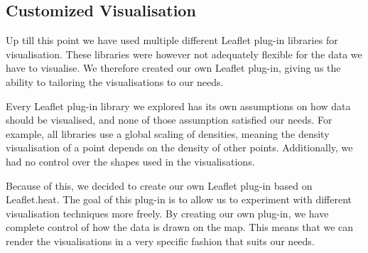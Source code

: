 \subsection{Customized Visualisation}\label{sec:own_leaflet_plugin}

Up till this point we have used multiple different Leaflet plug-in libraries for visualisation. These libraries were however not adequately flexible for the data we have to visualise. We therefore created our own Leaflet plug-in, giving us the ability to tailoring the visualisations to our needs.

Every Leaflet plug-in library we explored has its own assumptions on how data should be visualised, and none of those assumption satisfied our needs. For example, all libraries use a global scaling of densities, meaning the density visualisation of a point depends on the density of other points. Additionally, we had no control over the shapes used in the visualisations.

Because of this, we decided to create our own Leaflet plug-in based on Leaflet.heat. The goal of this plug-in is to allow us to experiment with different visualisation techniques more freely. By creating our own plug-in, we have complete control of how the data is drawn on the map. This means that we can render the visualisations in a very specific fashion that suits our needs.